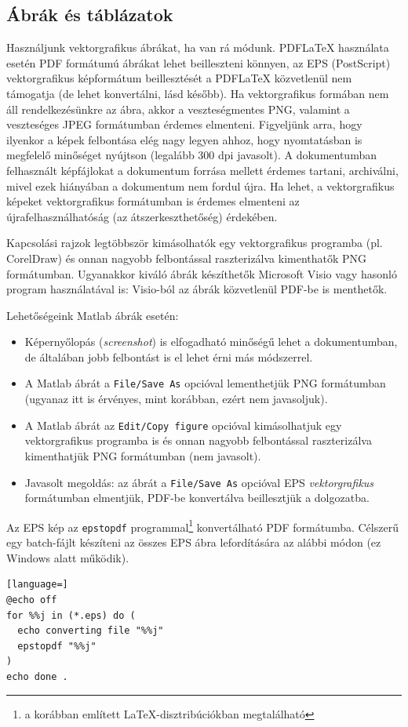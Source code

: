 \subsection{Ábrák és táblázatok}
Használjunk vektorgrafikus ábrákat, ha van rá módunk. PDFLaTeX használata esetén PDF formátumú ábrákat lehet beilleszteni könnyen, az EPS (PostScript) vektorgrafikus képformátum beillesztését a PDFLaTeX közvetlenül nem támogatja (de lehet konvertálni, lásd később). Ha vektorgrafikus formában nem áll rendelkezésünkre az ábra, akkor a  veszteségmentes PNG, valamint a veszteséges JPEG formátumban érdemes elmenteni.  Figyeljünk arra, hogy ilyenkor a képek felbontása elég nagy legyen ahhoz, hogy nyomtatásban is megfelelő minőséget nyújtson (legalább 300 dpi javasolt). A dokumentumban felhasznált képfájlokat a dokumentum forrása mellett érdemes tartani, archiválni, mivel ezek hiányában a dokumentum nem fordul újra. Ha lehet, a vektorgrafikus képeket vektorgrafikus formátumban is érdemes elmenteni az újrafelhasználhatóság (az átszerkeszthetőség) érdekében.

Kapcsolási rajzok legtöbbször kimásolhatók egy vektorgrafikus programba (pl. CorelDraw) és onnan nagyobb felbontással raszterizálva kimenthatők PNG formátumban. Ugyanakkor kiváló ábrák készíthetők Microsoft Visio vagy hasonló program használatával is: Visio-ból az ábrák közvetlenül PDF-be is menthetők.

Lehetőségeink Matlab ábrák esetén:
\begin{itemize}
	\item Képernyőlopás (\emph{screenshot}) is elfogadható minőségű lehet a dokumentumban, de általában jobb felbontást is el lehet érni más módszerrel.
	\item A Matlab ábrát a \verb+File/Save As+ opcióval lementhetjük PNG formátumban (ugyanaz itt is érvényes, mint korábban, ezért nem javasoljuk).
	\item A Matlab ábrát az \verb+Edit/Copy figure+ opcióval kimásolhatjuk egy vektorgrafikus programba is és onnan nagyobb felbontással raszterizálva kimenthatjük PNG formátumban (nem javasolt).
	\item Javasolt megoldás: az ábrát a \verb+File/Save As+ opcióval EPS \emph{vektorgrafikus} formátumban elmentjük, PDF-be konvertálva beillesztjük a dolgozatba.
\end{itemize}
Az EPS kép az \verb+epstopdf+ programmal\footnote{a korábban említett \LaTeX-disztribúciókban megtalálható} konvertálható PDF formátumba. Célszerű egy batch-fájlt készíteni az összes EPS ábra lefordítására az alábbi módon (ez Windows alatt működik).
\begin{lstlisting}[language=]
@echo off
for %%j in (*.eps) do (
  echo converting file "%%j"
  epstopdf "%%j"
)
echo done .
\end{lstlisting}

